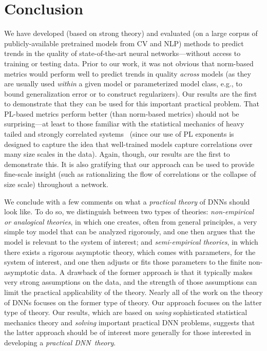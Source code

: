 \vspace{-1mm}
\section{Conclusion}
\label{sxn:conc}

We have developed (based on strong theory) and evaluated (on a large corpus of publicly-available pretrained models from CV and NLP) methods to predict trends in the quality of state-of-the-art neural networks---without access to training or testing data.
Prior to our work, it was not obvious that norm-based metrics would perform well to predict trends in quality \emph{across} models (as they are usually used \emph{within} a given model or parameterized model class, e.g., to bound generalization error or to construct regularizers).
Our results are the first to demonstrate that they can be used for this important practical problem.
That PL-based metrics perform better (than norm-based metrics) should not be surprising---at least to those familiar with the statistical mechanics of heavy tailed and strongly correlated systems~\cite{BouchaudPotters03, SornetteBook, BP11, bun2017} (since our use of PL exponents is designed to capture the idea that well-trained models capture correlations over many size scales in the data).
Again, though, our results are the first to demonstrate this.
It is also gratifying that our approach can be used to provide fine-scale insight (such as rationalizing the flow of correlations or the collapse of size scale) throughout a network. 

We conclude with a few comments on what a \emph{practical theory} of DNNs should look like.
To do so, we distinguish between two types of theories:
\emph{non-empirical or analogical theories}, in which one creates, often from general principles, a very simple toy model that can be analyzed rigorously, and one then argues that the model is relevant to the system of interest; and 
\emph{semi-empirical theories}, in which there exists a rigorous asymptotic theory, which comes with parameters, for the system of interest, and one then adjusts or fits those parameters to the finite non-asymptotic data.
A drawback of the former approach is that it typically makes very strong assumptions on the data, and the strength of those assumptions can limit the practical applicability of the theory.
Nearly all of the work on the theory of DNNs focuses on the former type of theory.
Our approach focuses on the latter type of theory.
Our results, which are based on \emph{using} sophisticated statistical mechanics theory and \emph{solving} important practical DNN problems, suggests that the latter approach should be of interest more generally for those interested in developing a \emph{practical DNN~theory}.


